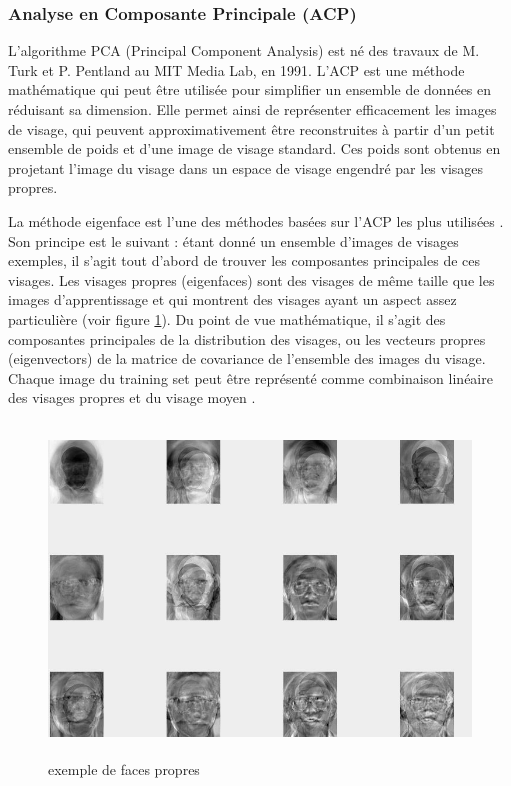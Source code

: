 \subsubsection{Analyse en Composante Principale (ACP) }

L'algorithme  PCA (Principal Component Analysis) est né des travaux de M. Turk et P. Pentland au MIT Media 
Lab, en 1991\citep{TURK}. L'ACP est une méthode mathématique qui peut être utilisée pour simplifier un ensemble de données en réduisant sa dimension. Elle permet ainsi de représenter efficacement les images de visage, qui peuvent approximativement être reconstruites à partir d'un petit ensemble de poids et d'une image de visage standard. Ces poids sont obtenus en projetant l'image du visage dans un espace de visage engendré par les visages propres.

La méthode \og eigenface \fg{} est l'une des méthodes basées sur l'ACP les plus utilisées \citep{Sou12}. Son principe est le suivant : étant donné un ensemble d'images de visages exemples, il s'agit tout d'abord de trouver les composantes principales de ces visages. Les visages propres (eigenfaces) sont des visages de même taille que les images d'apprentissage et qui montrent des visages ayant un aspect assez particulière (voir figure \ref {fig:eigenface}). Du point de vue mathématique, il s'agit des composantes principales de la distribution des visages, ou les vecteurs propres (eigenvectors) de la matrice de covariance de l'ensemble des images du visage. Chaque image du training set peut être représenté comme combinaison linéaire des visages propres et du visage moyen \citep{TOLBA}.
\begin{figure}[htbp]
	\centering
		\includegraphics[height=250pt, width=400pt]{eigenface.JPG}
	\caption{exemple de faces propres}
	\label{fig:eigenface}
\end{figure}

